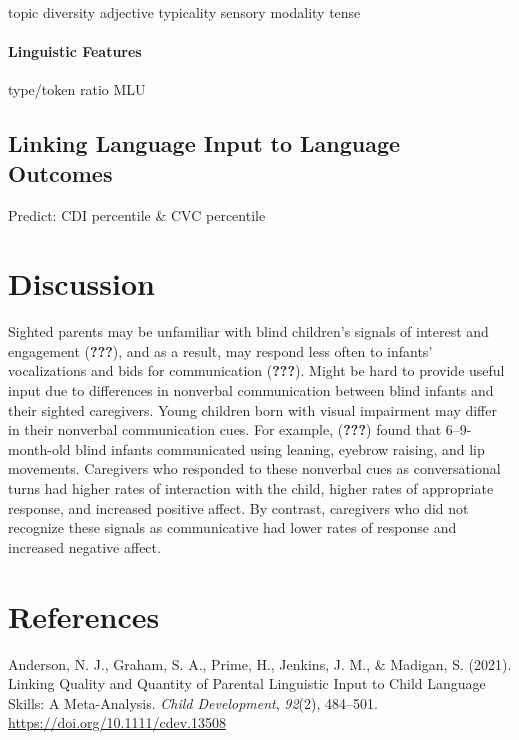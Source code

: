\documentclass[english,man]{apa6}
\begin{document}
topic diversity
adjective typicality
sensory modality
tense

\hypertarget{linguistic-features}{%
\paragraph{Linguistic Features}\label{linguistic-features}}

type/token ratio
MLU

\hypertarget{linking-language-input-to-language-outcomes}{%
\subsection{Linking Language Input to Language Outcomes}\label{linking-language-input-to-language-outcomes}}

Predict: CDI percentile \& CVC percentile

\hypertarget{discussion}{%
\section{Discussion}\label{discussion}}

Sighted parents may be unfamiliar with blind children's signals of interest and engagement ({\textbf{???}}), and as a result, may respond less often to infants' vocalizations and bids for communication ({\textbf{???}}). Might be hard to provide useful input due to differences in nonverbal communication between blind infants and their sighted caregivers. Young children born with visual impairment may differ in their nonverbal communication cues. For example, ({\textbf{???}}) found that 6--9-month-old blind infants communicated using leaning, eyebrow raising, and lip movements. Caregivers who responded to these nonverbal cues as conversational turns had higher rates of interaction with the child, higher rates of appropriate response, and increased positive affect. By contrast, caregivers who did not recognize these signals as communicative had lower rates of response and increased negative affect.

\pagebreak

\hypertarget{references}{%
\section*{References}\label{references}}

\hypertarget{refs}{}
\leavevmode\hypertarget{ref-anderson2021}{}%
Anderson, N. J., Graham, S. A., Prime, H., Jenkins, J. M., \& Madigan, S. (2021). Linking Quality and Quantity of Parental Linguistic Input to Child Language Skills: A Meta-Analysis. \emph{Child Development}, \emph{92}(2), 484--501. \url{https://doi.org/10.1111/cdev.13508}
\end{document}
